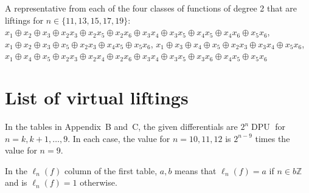 \documentclass[11pt,english,a4paper]{amsart}
\theoremstyle{plain}
\theoremstyle{definition}
\theoremstyle{remark}
\newcommand{\Z}{\mathbb{Z}}
\begin{document}
    A representative from each of the four classes of functions of degree 2 that are liftings for $n \in \{11, 13, 15, 17, 19\}$: $x_1 \oplus x_2 \oplus x_3 \oplus x_2x_3 \oplus x_2x_5 \oplus x_2x_6 \oplus x_3x_4 \oplus x_3x_5 \oplus x_4x_5 \oplus x_4x_6 \oplus x_5x_6$, $x_1 \oplus x_2 \oplus x_3 \oplus x_5 \oplus x_2x_3 \oplus x_4x_5 \oplus x_5x_6$, $x_1 \oplus x_3 \oplus x_4 \oplus x_5 \oplus x_2x_3 \oplus x_3x_4 \oplus x_5x_6$, $x_1 \oplus x_4 \oplus x_5 \oplus x_2x_3 \oplus x_2x_4 \oplus x_2x_6 \oplus x_3x_4 \oplus x_3x_5 \oplus x_3x_6 \oplus x_4x_5 \oplus x_5x_6$

	\section{List of virtual liftings}\label{appendix:virtual}
	
	In the tables in Appendix~B and~C, the given differentials are $2^n\operatorname{DPU}$ for $n=k,k+1,\dotsc,9$. In each case, the value for $n=10, 11, 12$ is $2^{n-9}$ times the value for $n=9$.
	
	In the $\ell_n(f)$ column of the first table, $a,b$ means that $\ell_n(f)=a$ if $n\in b\Z$ and is $\ell_n(f)=1$ otherwise.
	
\end{document}

